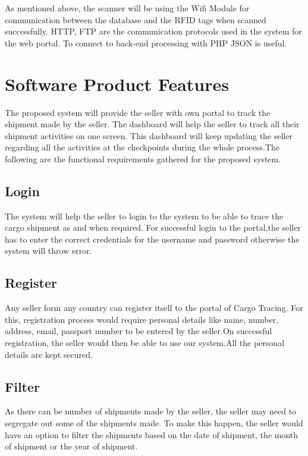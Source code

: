 \documentclass{scrreprt}
\begin{document}
As mentioned above, the scanner will be using the Wifi Module for communication between the database and the RFID tags when scanned successfully. HTTP, FTP are the communication protocols used in the system for the web portal. To connect to back-end processing with PHP JSON is useful.


\section{Software Product Features}
The proposed system will provide the seller with own portal to track the shipment made by the seller. The dashboard will help the seller to track all their shipment activities on one screen. This dashboard will keep updating the seller regarding all the activities at the checkpoints during the whole process.The following are the functional requirements gathered for the proposed system.
\newline \newline


   
 \subsection{  Login }
   
   The system will help the seller to login to the system to be able to trace the cargo shipment as and when required. For successful login to the portal,the seller has to enter the correct credentials for the username and password otherwise the system will throw error.
   
   \subsection{Register}
   
   Any seller form any country can register itself to the portal of Cargo Tracing. For this, registration process would require personal details like name, number, address, email, passport number to be entered by the seller.On successful registration, the seller would then be able to use our system.All the personal details are kept secured.
   
   \subsection{ Filter}
   
   As there can be number of shipments made by the seller, the seller may need to segregate out some of the shipments made. To make this happen, the seller would have an option to filter the shipments based on the date of shipment, the month of shipment or the year of shipment.
   
\end{document}
